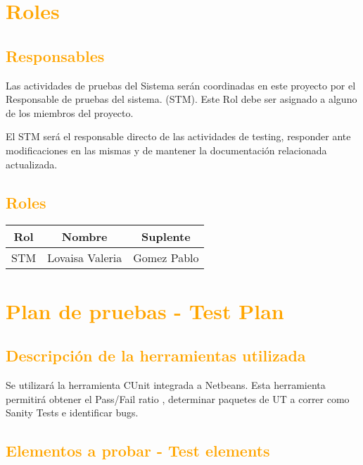 \newpage
\section{\textcolor{orange}{Roles}}
\subsection{\textcolor{orange}{Responsables}}

Las actividades de pruebas del Sistema serán coordinadas en este proyecto por el Responsable de pruebas del sistema. (STM). Este Rol debe ser asignado a alguno de los miembros del proyecto.

El STM será el responsable directo de las actividades de testing, responder ante modificaciones en las mismas  y de mantener la documentación relacionada actualizada.



\subsection{\textcolor{orange}{Roles}}
\begin{table}[!h]
\begin{center}
\begin{tabular}{|c|c|c|}
\hline
\rowcolor[RGB]{255,127,0} Rol & Nombre & Suplente\\
\hline
STM & Lovaisa Valeria & Gomez Pablo\\
\hline
\end{tabular}
\end{center}
\end{table}

\newpage
\section{\textcolor{orange}{Plan de pruebas - Test Plan}}
\subsection{\textcolor{orange}{Descripción de la herramientas utilizada}}

Se utilizará la herramienta CUnit integrada a Netbeans. Esta herramienta permitirá obtener el Pass/Fail ratio , determinar paquetes de UT a correr como Sanity Tests e  identificar bugs.

\subsection{\textcolor{orange}{Elementos a probar - Test elements}}

